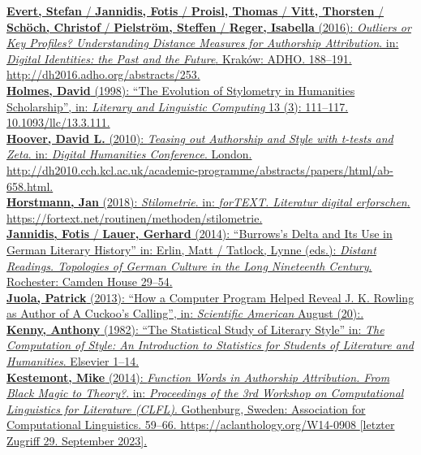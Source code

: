 \documentclass[
  letterpaper,
  DIV=11,
  numbers=noendperiod]{scrreprt}
\begin{document}
\href{https://www.zotero.org/google-docs/?4xA93b}{\textbf{Evert, Stefan}
/ \textbf{Jannidis, Fotis} / \textbf{Proisl, Thomas} / \textbf{Vitt,
Thorsten} / \textbf{Schöch, Christof} / \textbf{Pielström, Steffen} /
\textbf{Reger, Isabella} (2016): \emph{Outliers or Key Profiles?
Understanding Distance Measures for Authorship Attribution}. in:
\emph{Digital Identities: the Past and the Future}. Kraków: ADHO.
188--191. http://dh2016.adho.org/abstracts/253.}\\
\href{https://www.zotero.org/google-docs/?4xA93b}{\textbf{Holmes, David}
(1998): ``The Evolution of Stylometry in Humanities Scholarship'', in:
\emph{Literary and Linguistic Computing} 13 (3): 111--117.
10.1093/llc/13.3.111.}\\
\href{https://www.zotero.org/google-docs/?4xA93b}{\textbf{Hoover, David
L.} (2010): \emph{Teasing out Authorship and Style with t-tests and
Zeta}. in: \emph{Digital Humanities Conference}. London.
http://dh2010.cch.kcl.ac.uk/academic-programme/abstracts/papers/html/ab-658.html.}\\
\href{https://www.zotero.org/google-docs/?4xA93b}{\textbf{Horstmann,
Jan} (2018): \emph{Stilometrie}. in: \emph{forTEXT. Literatur digital
erforschen}. https://fortext.net/routinen/methoden/stilometrie.}\\
\href{https://www.zotero.org/google-docs/?4xA93b}{\textbf{Jannidis,
Fotis} / \textbf{Lauer, Gerhard} (2014): ``Burrows's Delta and Its Use
in German Literary History'' in: Erlin, Matt / Tatlock, Lynne (eds.):
\emph{Distant Readings. Topologies of German Culture in the Long
Nineteenth Century}. Rochester: Camden House 29--54.}\\
\href{https://www.zotero.org/google-docs/?4xA93b}{\textbf{Juola,
Patrick} (2013): ``How a Computer Program Helped Reveal J. K. Rowling as
Author of A Cuckoo's Calling'', in: \emph{Scientific American} August
(20):.}\\
\href{https://www.zotero.org/google-docs/?4xA93b}{\textbf{Kenny,
Anthony} (1982): ``The Statistical Study of Literary Style'' in:
\emph{The Computation of Style: An Introduction to Statistics for
Students of Literature and Humanities}. Elsevier 1--14.}\\
\href{https://www.zotero.org/google-docs/?4xA93b}{\textbf{Kestemont,
Mike} (2014): \emph{Function Words in Authorship Attribution. From Black
Magic to Theory?}. in: \emph{Proceedings of the 3rd Workshop on
Computational Linguistics for Literature (CLFL)}. Gothenburg, Sweden:
Association for Computational Linguistics. 59--66.
https://aclanthology.org/W14-0908 {[}letzter Zugriff 29. September
2023{]}.}\\
\end{document}
